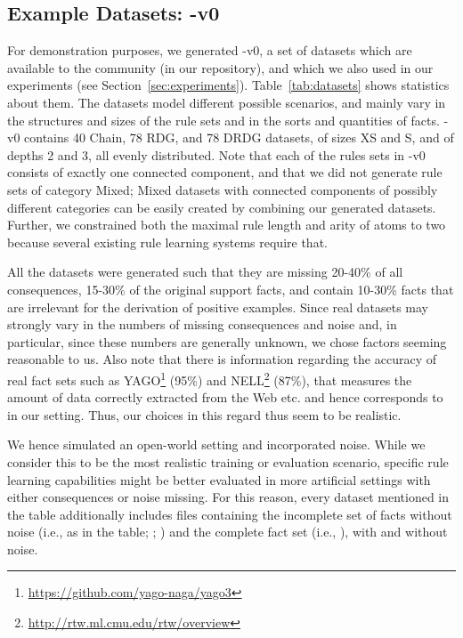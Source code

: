 \documentclass[letterpaper]{article} \usepackage{aaai20}  \usepackage{times}  \usepackage{helvet} \usepackage{courier}  \usepackage[hyphens]{url}  \usepackage{graphicx} \urlstyle{rm} \def\UrlFont{\rm}  \usepackage{graphicx}  \frenchspacing  \setlength{\pdfpagewidth}{8.5in}  \setlength{\pdfpageheight}{11in}  \usepackage{amsthm}
\theoremstyle{definition}
\newcommand{\tool}{\text{RuDaS}\xspace}
\begin{document}
\subsection*{Example Datasets: \tool-v0}\label{sec:generatedDatasets}

For demonstration purposes, we generated \tool-v0, a set of datasets which are available to the community (in our repository), and which we also used in our experiments (see Section~\ref{sec:experiments}).
Table~\ref{tab:datasets}
shows statistics about them.
The datasets model different possible scenarios, and mainly vary in the structures and sizes of the rule sets and in the sorts and quantities of facts. 
\tool-v0 contains 40 Chain, 78 RDG, and 78 DRDG datasets, of sizes XS and S, and of depths 2 and 3, all evenly distributed.
Note that each of the rules sets in \tool-v0 consists of exactly one connected component, and that we did not generate rule sets of category Mixed; Mixed datasets with connected components of possibly different categories can be easily created by combining our generated datasets.  
Further, we constrained both the maximal rule length and arity of atoms to two because several existing rule learning systems require that.

All the datasets were generated such that they are missing 20-40\% of all consequences,  15-30\% of the original support facts, and contain 10-30\% facts that are irrelevant for the derivation of positive examples.
Since real datasets may strongly vary in the numbers of missing consequences and noise and, in particular, since these numbers are generally unknown, we chose factors seeming reasonable to us. Also note that there is information regarding
the accuracy of real fact sets such as YAGO\footnote{\url{https://github.com/yago-naga/yago3}} (95\%) and NELL\footnote{\url{http://rtw.ml.cmu.edu/rtw/overview}} (87\%), that measures the amount of data correctly extracted from the Web etc. and hence corresponds to   in our setting. Thus, our choices in this regard thus seem to be realistic.


We hence simulated an open-world setting and incorporated noise. While we consider this to be the most realistic training or evaluation scenario, specific rule learning capabilities might be better evaluated
in more artificial settings with either consequences or noise missing. For this reason, every dataset mentioned in the table additionally includes files containing the incomplete set of facts without noise (i.e.,  as in the table; ; ) and the 
complete fact set (i.e., ), with and without noise.
\end{document}
